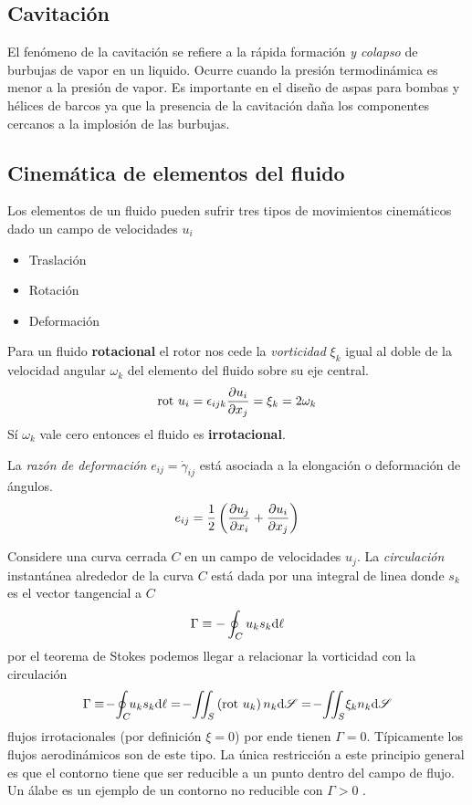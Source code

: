 \subsection{Cavitación}
El fenómeno de la cavitación se refiere a la rápida formación \textit{y colapso} de burbujas de vapor en un liquido. Ocurre cuando la presión termodinámica es menor a la presión de vapor. Es importante en el diseño de aspas para bombas y hélices de barcos ya que la presencia de la cavitación daña los componentes cercanos a la implosión de las burbujas.

\subsection{Cinemática de elementos del fluido} \label{sec:CinematicaDeElementosdeFluido}
Los elementos de un fluido pueden sufrir tres tipos de movimientos cinemáticos dado un campo de velocidades $u_i$ 
\begin{itemize}
    \item Traslación
    \item Rotación
    \item Deformación
\end{itemize}

Para un fluido \textbf{rotacional} el rotor nos cede la \textit{vorticidad} $\xi_k$ igual al doble de la velocidad angular $\omega_k$ del elemento del fluido sobre su eje central.
\begin{equation}
    \textrm{rot } u_i =\epsilon_{ijk}\frac{\partial u_i}{\partial x_j}=\xi_k= 2\omega_k 
\end{equation}
Sí $\omega_k$ vale cero entonces el fluido es \textbf{irrotacional}. 

La \textit{razón de deformación} $e_{ij}=\dot{\gamma}_{ij}$ está asociada a la elongación o deformación de ángulos. \begin{equation}
    e_{ij}=\frac{1}{2}\left( \frac{\partial u_j}{\partial x_i}+\frac{\partial u_i}{\partial x_j}\right)
\end{equation}

Considere una curva cerrada $C$ en un campo de velocidades $u_j$. La \textit{circulación} instantánea alrededor de la curva $C$ está dada por una integral de linea donde $s_k$ es el vector tangencial a $C$
\begin{equation}
    \Gamma \equiv - \oint_C u_k s_k \textrm{d} \ell
\end{equation}
por el teorema de Stokes podemos llegar a relacionar la vorticidad con la circulación
\[
\Gamma \equiv\! -\! \oint_C\!\! u_k s_k \di \ell =\! -\!\iint_S \left( \rotor u_k \right)n_k\di \sur=\! -\!\iint_S\! \xi_k n_k\di \sur
\]
flujos irrotacionales (por definición $\xi=0$) por ende tienen $\Gamma=0$. Típicamente los flujos aerodinámicos son de este tipo. La única restricción a este principio general es que el contorno tiene que ser reducible a un punto dentro del campo de flujo. Un álabe es un ejemplo de un contorno no reducible con $\Gamma>0$ \citep{durst2008fluid}.
